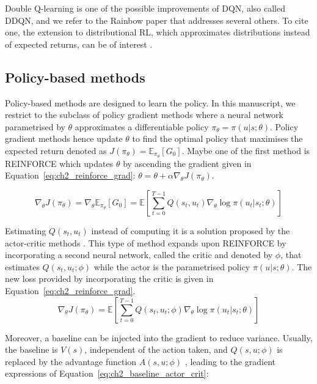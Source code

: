 Double Q-learning is one of the possible improvements of DQN, also called DDQN, and we refer to the Rainbow paper \citep{hessel2018rainbow} that addresses several others.
To cite one, the extension to distributional RL, which approximates distributions instead of expected returns, can be of interest \citep{bellemare2017distributional, THEATE2023199}. 

\subsection{Policy-based methods} \label{sec:ch2_policy_based_methods}
Policy-based methods are designed to learn the policy.
In this manuscript, we restrict to the subclass of policy gradient methods where a neural network parametrised by $\theta$ approximates a differentiable policy $\pi_\theta=\pi(u|s;\theta)$.
Policy gradient methods hence update $\theta$ to find the optimal policy that maximises the expected return denoted as  $J(\pi_\theta) = \mathbb{E}_{\pi_\theta}[G_0]$.
Maybe one of the first method is REINFORCE \citep{williams1992simple} which updates $\theta$  by ascending the gradient given in Equation~\ref{eq:ch2_reinforce_grad}: $\theta = \theta + \alpha \nabla_\theta J(\pi_\theta)$.

\begin{equation}
\label{eq:ch2_reinforce_grad}
    \nabla_\theta J(\pi_\theta) = \nabla_\theta \mathbb{E}_{\pi_\theta}[G_0] = \mathbb{E}\left[\sum_{t=0}^{T-1} Q(s_t, u_t) \nabla_\theta \log \pi(u_t|s_t;\theta)\right]
\end{equation}

Estimating $Q(s_t, u_t)$ instead of computing it is a solution proposed by the actor-critic methods \citep{sutton1999policy,konda1999actor}.
This type of method expands upon REINFORCE by incorporating a second neural network, called the critic and denoted by $\phi$, that estimates $Q(s_t, u_t;\phi)$ while the actor is the parametrised policy $\pi(u|s;\theta)$.
The new loss provided by incorporating the critic is given in Equation~\ref{eq:ch2_reinforce_grad}.
\begin{equation}
\label{eq:ch2_Q_actor_crit}
    \nabla_\theta J(\pi_\theta) = \mathbb{E}\left[\sum_{t=0}^{T-1} Q(s_t, u_t;\phi) \nabla_\theta \log \pi(u_t|s_t;\theta)\right]
\end{equation}

Moreover, a baseline can be injected into the gradient to reduce variance.
Usually, the baseline is  $V(s)$, independent of the action taken, and $Q(s, u;\phi)$ is replaced by the advantage function $A(s,u; \phi)$ \citep{10.5555/2074022.2074088}, leading to the gradient expressions of Equation~\ref{eq:ch2_baseline_actor_crit}:


